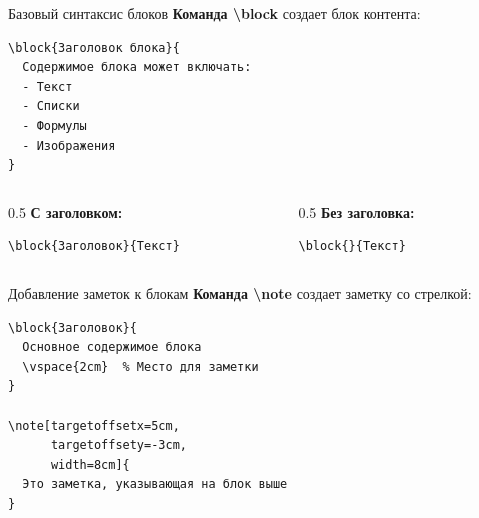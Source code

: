 \documentclass[aspectratio=169]{beamer}
\begin{document}
\begin{frame}[fragile]{Базовый синтаксис блоков}
    \textbf{Команда \textbackslash block} создает блок контента:
    
    \vspace{0.3cm}
    
    \begin{lstlisting}
\block{Заголовок блока}{
  Содержимое блока может включать:
  - Текст
  - Списки
  - Формулы
  - Изображения
}
    \end{lstlisting}
    
    \vspace{0.3cm}
    
    \begin{columns}[T]
        \begin{column}{0.5\textwidth}
            \textbf{С заголовком:}
            \begin{lstlisting}
\block{Заголовок}{Текст}
            \end{lstlisting}
        \end{column}
        
        \begin{column}{0.5\textwidth}
            \textbf{Без заголовка:}
            \begin{lstlisting}
\block{}{Текст}
            \end{lstlisting}
        \end{column}
    \end{columns}
\end{frame}

\begin{frame}[fragile]{Добавление заметок к блокам}
    \textbf{Команда \textbackslash note} создает заметку со стрелкой:
    
    \vspace{0.3cm}
    
    \begin{lstlisting}
\block{Заголовок}{
  Основное содержимое блока
  \vspace{2cm}  % Место для заметки
}

\note[targetoffsetx=5cm, 
      targetoffsety=-3cm, 
      width=8cm]{
  Это заметка, указывающая на блок выше
}
    \end{lstlisting}
\end{frame}
\end{document}
